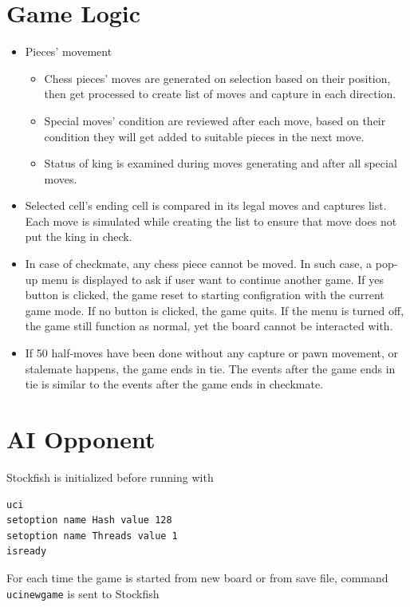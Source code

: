 \documentclass[a4paper, 10pt, titlepage]{report}
\begin{document}
\section{Game Logic}
\begin{itemize}
  \item Pieces' movement
        \begin{itemize}
          \item Chess pieces' moves are generated on selection based on their position, then get processed to create list of moves and capture in each direction.
          \item Special moves' condition are reviewed after each move, based on their condition they will get added to suitable pieces in the next move.
          \item Status of king is examined during moves generating and after all special moves.
        \end{itemize}
  \item Selected cell's ending cell is compared in its legal moves and captures list. Each move is simulated while creating the list to ensure that move does not put the king in check.
  \item In case of checkmate, any chess piece cannot be moved. In such case, a pop-up menu is displayed to ask if user want to continue another game. If yes button is clicked, the game reset to starting configration with the current game mode. If no button is clicked, the game quits. If the menu is turned off, the game still function as normal, yet the board cannot be interacted with.
  \item If 50 half-moves have been done without any capture or pawn movement, or stalemate happens, the game ends in tie. The events after the game ends in tie is similar to the events after the game ends in checkmate. 
\end{itemize}
\section{AI Opponent}
Stockfish is initialized before running with
\begin{verbatim}
uci
setoption name Hash value 128
setoption name Threads value 1
isready
\end{verbatim}

For each time the game is started from new board or from save file, command \texttt{ucinewgame} is sent to Stockfish
\end{document}
